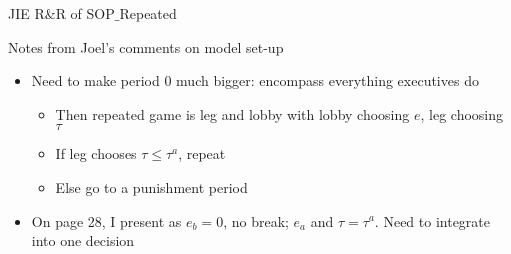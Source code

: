 \documentclass[12pt]{article}
\begin{document}
\begin{center}
JIE R$\&$R of SOP$\_$Repeated
\end{center}

Notes from Joel's comments on model set-up
\begin{itemize}
	\item Need to make period 0 much bigger: encompass everything executives do
		\begin{itemize}
			\item Then repeated game is leg and lobby with lobby choosing $e$, leg choosing $\tau$
			\item If leg chooses $\tau \leq \tau^a$, repeat
			\item Else go to a punishment period
		\end{itemize}
	\item On page 28, I present as $e_b =0$, no break; $e_a$ and $\tau = \tau^a$. Need to integrate into one decision
\end{itemize}
\end{document}
